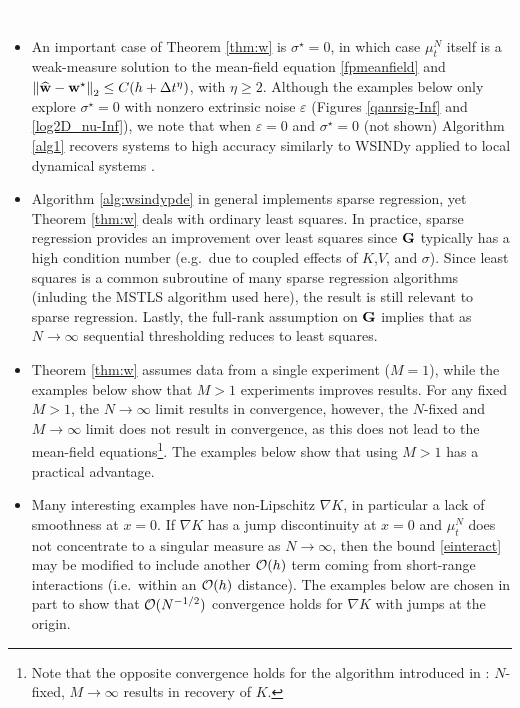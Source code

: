 \documentclass[english,reqno]{amsart}
\begin{document}
\begin{rmrk}
\textcolor{white}{blah}\\ \vspace{-0.5cm}
\begin{itemize}
\item An important case of Theorem \ref{thm:w} is $\sigma^\star=0$, in which case $\mu^N_t$ itself is a weak-measure solution to the mean-field equation \eqref{fpmeanfield} and $\left\Vert {{\widehat{\mathbf{w}}}-\mathbf{w}^\star} \right\Vert_2 \leq C(h+\Delta t^\eta)$, with $\eta\geq 2$. Although the examples below only explore $\sigma^\star=0$ with nonzero extrinsic noise $\varepsilon$ (Figures \ref{qanrsig-Inf} and \ref{log2D_nu-Inf}), we note that when $\varepsilon=0$ and $\sigma^\star=0$ (not shown) Algorithm \ref{alg1} recovers systems to high accuracy similarly to WSINDy applied to local dynamical systems \cite{messenger2020weak,messenger2020weakpde}.  
\item Algorithm \ref{alg:wsindypde} in general implements sparse regression, yet Theorem \ref{thm:w} deals with ordinary least squares. In practice, sparse regression provides an improvement over least squares since $\mathbf{G}$ typically has a high condition number (e.g.\ due to coupled effects of $K$,$V$, and $\sigma$). Since least squares is a common subroutine of many sparse regression algorithms (inluding the MSTLS algorithm used here), the result is still relevant to sparse regression. Lastly, the full-rank assumption on $\mathbf{G}$ implies that as $N\to \infty$ sequential thresholding reduces to least squares. 
\item Theorem \ref{thm:w} assumes data from a single experiment ($M=1$), while the examples below show that $M>1$ experiments improves results. For any fixed $M>1$, the $N\to\infty$ limit results in convergence, however, the $N$-fixed and $M\to \infty$ limit does not result in convergence, as this does not lead to the mean-field equations\footnote{Note that the opposite convergence holds for the algorithm introduced in \cite{lu2020learning}: $N$-fixed, $M\to \infty$ results in recovery of $K$.}. The examples below show that using $M>1$ has a practical advantage. 
\item Many interesting examples have non-Lipschitz $\nabla K$, in particular a lack of smoothness at $x=0$. If $\nabla K$ has a jump discontinuity at $x=0$ and $\mu^N_t$ does not concentrate to a singular measure as $N\to \infty$, then the bound \eqref{einteract} may be modified to include another ${\mathcal{O}}(h)$ term coming from short-range interactions (i.e.\ within an ${\mathcal{O}}(h)$ distance). The examples below are chosen in part to show that ${\mathcal{O}}(N^{-1/2})$ convergence holds for $\nabla K$ with jumps at the origin.  
\end{itemize}
\end{rmrk}
\end{document}

